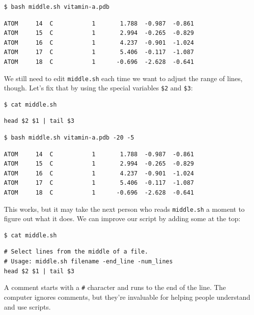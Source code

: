 \documentclass{book}
\begin{document}
\begin{verbatim}
$ bash middle.sh vitamin-a.pdb
\end{verbatim}

\begin{verbatim}
ATOM     14  C           1       1.788  -0.987  -0.861
ATOM     15  C           1       2.994  -0.265  -0.829
ATOM     16  C           1       4.237  -0.901  -1.024
ATOM     17  C           1       5.406  -0.117  -1.087
ATOM     18  C           1      -0.696  -2.628  -0.641
\end{verbatim}

We still need to edit \texttt{middle.sh} each time we want to adjust the
range of lines, though. Let's fix that by using the special variables
\texttt{\$2} and \texttt{\$3}:

\begin{verbatim}
$ cat middle.sh
\end{verbatim}

\begin{verbatim}
head $2 $1 | tail $3
\end{verbatim}

\begin{verbatim}
$ bash middle.sh vitamin-a.pdb -20 -5
\end{verbatim}

\begin{verbatim}
ATOM     14  C           1       1.788  -0.987  -0.861
ATOM     15  C           1       2.994  -0.265  -0.829
ATOM     16  C           1       4.237  -0.901  -1.024
ATOM     17  C           1       5.406  -0.117  -1.087
ATOM     18  C           1      -0.696  -2.628  -0.641
\end{verbatim}

This works, but it may take the next person who reads \texttt{middle.sh}
a moment to figure out what it does. We can improve our script by adding
some  at the top:

\begin{verbatim}
$ cat middle.sh
\end{verbatim}

\begin{verbatim}
# Select lines from the middle of a file.
# Usage: middle.sh filename -end_line -num_lines
head $2 $1 | tail $3
\end{verbatim}

A comment starts with a \texttt{\#} character and runs to the end of the
line. The computer ignores comments, but they're invaluable for helping
people understand and use scripts.
\end{document}
